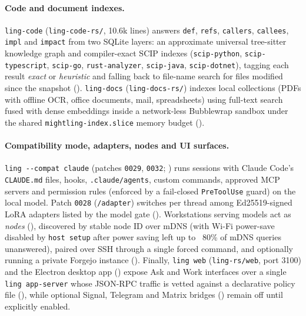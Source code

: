 \documentclass[11pt]{article}
\newcommand{\code}[1]{\texttt{#1}}
\begin{document}
\paragraph{Code and document indexes.} \code{ling-code} (\code{ling-code-rs/}, 10.6k lines) answers
\code{def}, \code{refs}, \code{callers}, \code{callees}, \code{impl} and \code{impact} from two
SQLite layers: an approximate universal tree-sitter knowledge graph \cite{treesitter,codebasememorymcp,vogel2026codebasememory}
and compiler-exact SCIP \cite{scip} indexes (\code{scip-python}, \code{scip-typescript},
\code{scip-go}, \code{rust-analyzer}, \code{scip-java}, \code{scip-dotnet}), tagging each result
\emph{exact} or \emph{heuristic} and falling back to file-name search for files modified since the
snapshot (). \code{ling-docs} (\code{ling-docs-rs/}) indexes local
collections (PDFs with offline OCR, office documents, mail, spreadsheets) using full-text search
fused with dense embeddings inside a network-less Bubblewrap sandbox under the shared
\code{mightling-index.slice} memory budget ().

\paragraph{Compatibility mode, adapters, nodes and UI surfaces.} \code{ling -{}-compat claude}
(patches \code{0029}, \code{0032}; ) runs sessions with Claude Code's
\code{CLAUDE.md} files, hooks, \code{.claude/agents}, custom commands, approved MCP servers and
permission rules (enforced by a fail-closed \code{PreToolUse} guard) on the local model. Patch
\code{0028} (\code{/adapter}) switches per thread among Ed25519-signed LoRA adapters listed by the
model gate (). Workstations serving models act as \emph{nodes}
(), discovered by stable node ID over mDNS (with Wi-Fi power-save disabled
by \code{host setup} after power saving left up to ~80\% of mDNS queries unanswered),
paired over SSH through a single forced command, and optionally running a private Forgejo instance
(). Finally, \code{ling web} (\code{ling-rs/web}, port 3100) and the
Electron desktop app () expose Ask and Work interfaces over a single
\code{ling app-server} whose JSON-RPC traffic is vetted against a declarative policy file
(),
while optional Signal, Telegram and Matrix bridges () remain off until
explicitly enabled.
\end{document}
